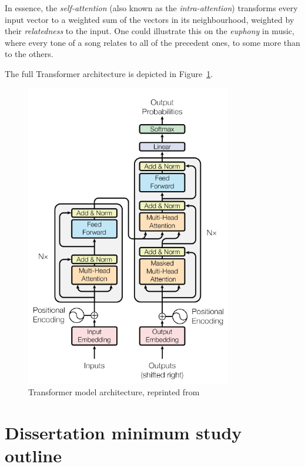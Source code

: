 In essence, the \textit{self-attention} (also known as the \textit{intra-attention}) transforms every input vector to a weighted sum of the vectors in its neighbourhood, weighted by their \textit{relatedness} to the input. One could illustrate this on the \textit{euphony} in music, where every tone of a song relates to all of the precedent ones, to some more than to the others.

The full Transformer architecture is depicted in Figure~\ref{fig:transformer}.
\begin{figure}
\includegraphics[width=9cm]{fig/transformer.pdf}
\caption{Transformer model architecture, reprinted from~\cite{vaswani}}
\label{fig:transformer}
\end{figure}



\section{Dissertation minimum study outline}
 
